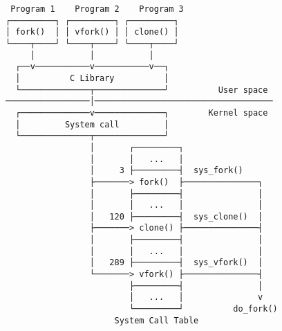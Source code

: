 \documentclass[varwidth=35.2em,crop]{standalone}
\begin{document}
\begin{verbatim}
 Program 1    Program 2    Program 3
┌─────────┐ ┌─────────┐ ┌─────────┐
│ fork()  │ │ vfork() │ │ clone() │
└────┬────┘ └────┬────┘ └────┬────┘
     │           │           │
  ┌──v───────────v───────────v──┐
  │          C Library          │
  └──────────────┬──────────────┘          User space
─────────────────│────────────────────────────────────
  ┌──────────────v──────────────┐        Kernel space
  │         System call         │
  └──────────────┬──────────────┘
                 │       ┌─────────┐
                 │       │   ...   │
                 │     3 ├─────────┤  sys_fork()
                 ├───────> fork()  ├───────────────┐
                 │       ├─────────┤               │
                 │       │   ...   │               │
                 │   120 ├─────────┤  sys_clone()  │
                 ├───────> clone() ├───────────────┤
                 │       ├─────────┤               │
                 │       │   ...   │               │
                 │   289 ├─────────┤  sys_vfork()  │
                 └───────> vfork() ├───────────────┤
                         ├─────────┤               │
                         │   ...   │               v
                         └─────────┘          do_fork()
                      System Call Table
\end{verbatim}
\end{document}
